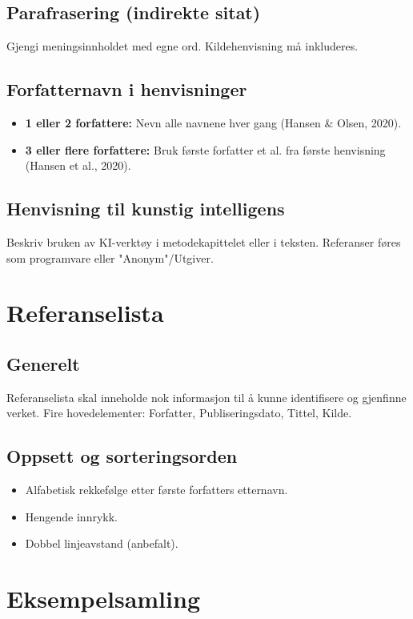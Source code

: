 \documentclass[a4paper,12pt]{report}
\begin{document}
\section{Parafrasering (indirekte sitat)}
Gjengi meningsinnholdet med egne ord. Kildehenvisning må inkluderes.

\section{Forfatternavn i henvisninger}
\begin{itemize}
    \item \textbf{1 eller 2 forfattere:} Nevn alle navnene hver gang (Hansen \& Olsen, 2020).
    \item \textbf{3 eller flere forfattere:} Bruk første forfatter et al. fra første henvisning (Hansen et al., 2020).
\end{itemize}

\section{Henvisning til kunstig intelligens}
Beskriv bruken av KI-verktøy i metodekapittelet eller i teksten. Referanser føres som programvare eller "Anonym"/Utgiver.

\chapter{Referanselista}
\section{Generelt}
Referanselista skal inneholde nok informasjon til å kunne identifisere og gjenfinne verket.
Fire hovedelementer: Forfatter, Publiseringsdato, Tittel, Kilde.

\section{Oppsett og sorteringsorden}
\begin{itemize}
    \item Alfabetisk rekkefølge etter første forfatters etternavn.
    \item Hengende innrykk.
    \item Dobbel linjeavstand (anbefalt).
\end{itemize}

\chapter{Eksempelsamling}
\end{document}
